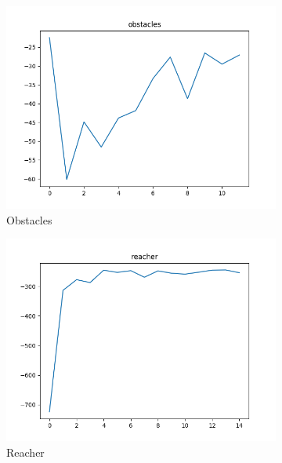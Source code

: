 \begin{figure}[htbp]
    \begin{subfigure}[b]{0.3\linewidth}
        \centering
        \includegraphics[width=1.0\linewidth]{figures/p3-ob.png}
        \caption{Obstacles}
    \end{subfigure}
    \begin{subfigure}[b]{0.3\linewidth}
        \centering
        \includegraphics[width=1.0\linewidth]{figures/p3-re.png}
        \caption{Reacher}
    \end{subfigure}
    \begin{subfigure}[b]{0.3\linewidth}
        \centering

\end{subfigure}
\end{figure}
